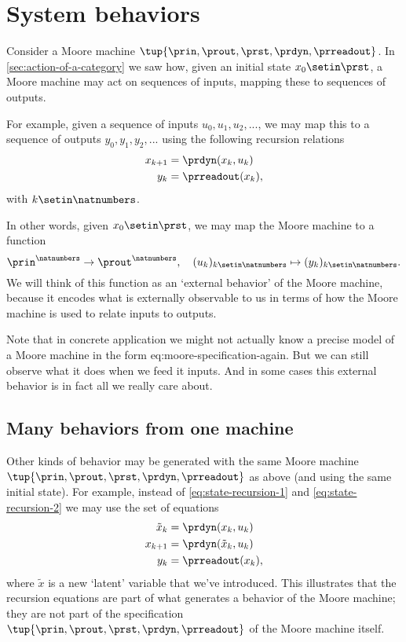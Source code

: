 \section{System behaviors}


Consider a Moore machine $\tup{\prin, \prout, \prst, \prdyn, \prreadout}$.
In \cref{sec:action-of-a-category} we saw how, given an initial state $x_0 \setin \prst$, a Moore machine may act on sequences of inputs, mapping these to sequences of outputs.

For example, given a sequence of inputs $u_0, u_1, u_2, .
    .. $, we may map this to a sequence of outputs $y_0, y_1, y_2, ... $ using the following recursion relations
\begin{align}
    x_{k+1} & = \prdyn(x_k, u_k) \label{eq:state-recursion-1} \\
    y_{k}   & = \prreadout(x_{k}), \label{eq:state-recursion-2}
\end{align}
with $k \setin \natnumbers$.

In other words, given $x_0 \setin \prst$, we may map the Moore machine \label{eq:moore-again} to a function
\begin{equation}
    \prin^\natnumbers \to \prout^\natnumbers,  \quad (u_k)_{k \setin \natnumbers} \mapsto (y_k)_{k \setin \natnumbers}.
\end{equation}
We will think of this function as an `external behavior' of the Moore machine, because it encodes what is externally observable to us in terms of how the Moore machine is used to relate inputs to outputs.

Note that in concrete application we might not actually know a precise model of a Moore machine in the form {eq:moore-specification-again}.
But we can still observe what it does when we feed it inputs.
And in some cases this external behavior is in fact all we really care about.

\subsection{Many behaviors from one machine}

Other kinds of behavior may be generated with the same Moore machine $\tup{\prin, \prout, \prst, \prdyn, \prreadout}$ as above (and using the same initial state).
For example, instead of \cref{eq:state-recursion-1} and \cref{eq:state-recursion-2} we may use the set of equations
\begin{align}
    \tilde x_{k} & = \prdyn(x_k, u_k) \\
    x_{k+1}      & = \prdyn(\tilde x_{k}, u_k) \\
    y_{k}        & = \prreadout(x_{k}),
\end{align}
where $\tilde x$ is a new `latent' variable that we've introduced.
This illustrates that the recursion equations are part of what generates a behavior of the Moore machine; they are not part of the specification $\tup{\prin, \prout, \prst, \prdyn, \prreadout}$ of the Moore machine itself.

